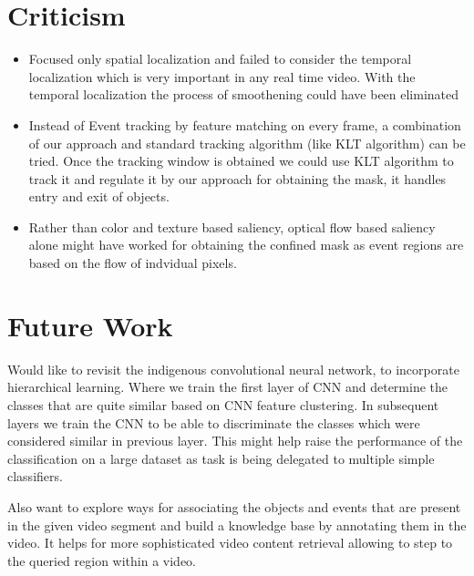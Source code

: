 \section{Criticism}
\begin{itemize}
	\item{Focused only spatial localization and failed to consider the temporal localization which is very important in any real time video. With the temporal localization the process of smoothening could have been eliminated}
	\item{Instead of Event tracking by feature matching on every frame, a combination of our approach and standard tracking algorithm (like KLT algorithm) can be tried. Once the tracking window is obtained we could use KLT algorithm to track it and regulate it by our approach for obtaining the mask, it handles entry and exit of objects.}
	\item{Rather than color and texture based saliency, optical flow based saliency alone might have worked for obtaining the confined mask as event regions are based on the flow of indvidual pixels.}
\end{itemize}

\section{Future Work}
Would like to revisit the indigenous convolutional neural network, to incorporate hierarchical learning. Where we train the first layer of CNN  and determine the classes that are quite similar based on CNN feature clustering. In subsequent layers we train the CNN to be able to discriminate the classes which were considered similar in previous layer. This might help raise the performance of the classification on a large dataset as task is being delegated to multiple simple classifiers.
\par Also want to explore ways for associating the objects and events that are present in the given video segment and build a knowledge base by annotating them in the video. It helps for more sophisticated video content retrieval allowing to step to the queried region within a video.